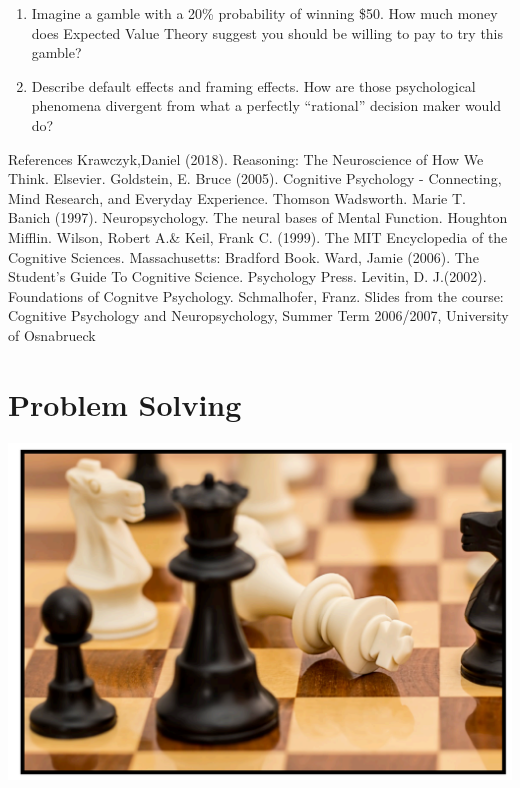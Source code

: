 \documentclass[
]{krantz}
\providecommand{\tightlist}{%
  \setlength{\itemsep}{0pt}\setlength{\parskip}{0pt}}
\begin{document}
\begin{enumerate}
\def\labelenumi{\arabic{enumi}.}
\tightlist
\item
  Imagine a gamble with a 20\% probability of winning \$50. How much money does Expected Value Theory suggest you should be willing to pay to try this gamble?
\item
  Describe default effects and framing effects. How are those psychological phenomena divergent from what a perfectly ``rational'' decision maker would do?
\end{enumerate}

References
Krawczyk,Daniel (2018). Reasoning: The Neuroscience of How We Think. Elsevier.
Goldstein, E. Bruce (2005). Cognitive Psychology - Connecting, Mind Research, and Everyday Experience. Thomson Wadsworth.
Marie T. Banich (1997). Neuropsychology. The neural bases of Mental Function. Houghton Mifflin.
Wilson, Robert A.\& Keil, Frank C. (1999). The MIT Encyclopedia of the Cognitive Sciences. Massachusetts: Bradford Book.
Ward, Jamie (2006). The Student's Guide To Cognitive Science. Psychology Press.
Levitin, D. J.(2002). Foundations of Cognitve Psychology.
Schmalhofer, Franz. Slides from the course: Cognitive Psychology and Neuropsychology, Summer Term 2006/2007, University of Osnabrueck

\hypertarget{problem-solving}{%
\chapter{Problem Solving}\label{problem-solving}}

\begin{center}\includegraphics[width=1\linewidth]{images/ch10/fig0} \end{center}
\end{document}
